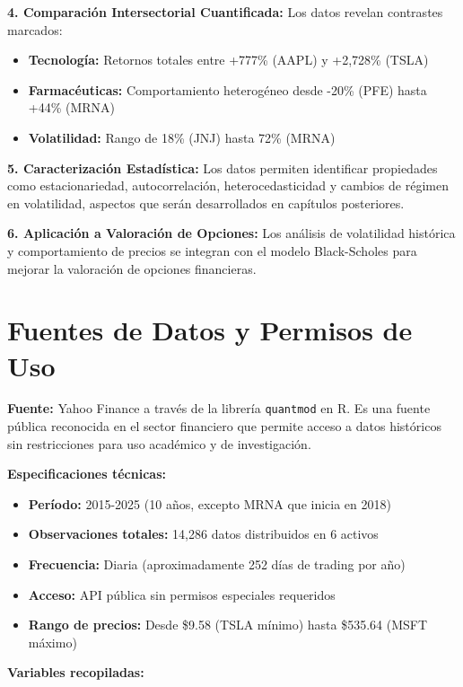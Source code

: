 \documentclass[
]{book}
\providecommand{\tightlist}{%
  \setlength{\itemsep}{0pt}\setlength{\parskip}{0pt}}
\begin{document}
\textbf{4. Comparación Intersectorial Cuantificada:} Los datos revelan contrastes marcados:

\begin{itemize}
\tightlist
\item
  \textbf{Tecnología:} Retornos totales entre +777\% (AAPL) y +2,728\% (TSLA)
\item
  \textbf{Farmacéuticas:} Comportamiento heterogéneo desde -20\% (PFE) hasta +44\% (MRNA)
\item
  \textbf{Volatilidad:} Rango de 18\% (JNJ) hasta 72\% (MRNA)
\end{itemize}

\textbf{5. Caracterización Estadística:} Los datos permiten identificar propiedades como estacionariedad, autocorrelación, heterocedasticidad y cambios de régimen en volatilidad, aspectos que serán desarrollados en capítulos posteriores.

\textbf{6. Aplicación a Valoración de Opciones:} Los análisis de volatilidad histórica y comportamiento de precios se integran con el modelo Black-Scholes para mejorar la valoración de opciones financieras.

\section{Fuentes de Datos y Permisos de Uso}\label{fuentes-de-datos-y-permisos-de-uso}

\textbf{Fuente:} Yahoo Finance a través de la librería \texttt{quantmod} en R. Es una fuente pública reconocida en el sector financiero que permite acceso a datos históricos sin restricciones para uso académico y de investigación.

\textbf{Especificaciones técnicas:}

\begin{itemize}
\tightlist
\item
  \textbf{Período:} 2015-2025 (10 años, excepto MRNA que inicia en 2018)
\item
  \textbf{Observaciones totales:} 14,286 datos distribuidos en 6 activos
\item
  \textbf{Frecuencia:} Diaria (aproximadamente 252 días de trading por año)
\item
  \textbf{Acceso:} API pública sin permisos especiales requeridos
\item
  \textbf{Rango de precios:} Desde \$9.58 (TSLA mínimo) hasta \$535.64 (MSFT máximo)
\end{itemize}

\textbf{Variables recopiladas:}
\end{document}
